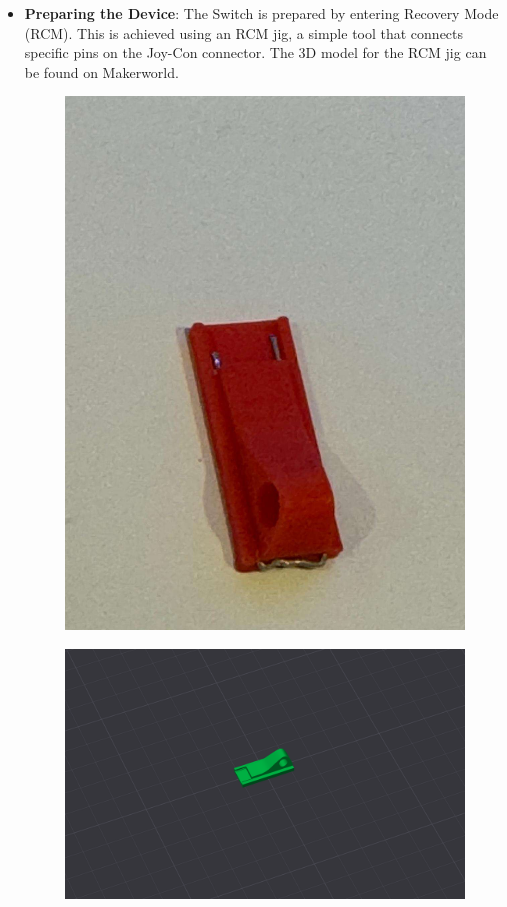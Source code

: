 \begin{itemize}

    \item \textbf{Preparing the Device}: The Switch is prepared by entering Recovery Mode (RCM). This is achieved using an RCM jig, a simple tool that connects specific pins on the Joy-Con connector. The 3D model for the RCM jig can be found on Makerworld\cite{NintendoSwitchJig}.

   \begin{figure}[H]
       \centering
       \begin{minipage}{.5\textwidth}
           \centering
           \includegraphics[width=.8\linewidth]{images/rcm_jig.jpg}
           \label{fig:rcm_jig}
       \end{minipage}%
       \begin{minipage}{.5\textwidth}
           \centering
           \includegraphics[width=.8\linewidth]{images/nintendo_jig.png}
           \label{fig:switch_rcm}
       \end{minipage}
    \end{figure}


\end{itemize}
